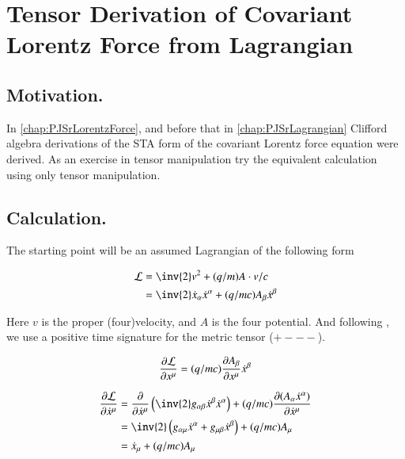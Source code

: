 \chapter{Tensor Derivation of Covariant Lorentz Force from Lagrangian}
\label{chap:maxwellTensorLagrangian}
\date{ October 12, 2008.  $RCSfile: maxwellTensorLagrangian.tex,v $ Last $Revision: 1.13 $ $Date: 2009/07/04 18:48:21 $ }

\section{Motivation. }

In \ref{chap:PJSrLorentzForce}, and before that in \ref{chap:PJSrLagrangian} Clifford
algebra derivations of the STA form of the covariant Lorentz force equation
were derived.  As an exercise in tensor manipulation try the equivalent
calculation using only tensor manipulation.

\section{Calculation. }

The starting point will be an assumed Lagrangian of the following form

\begin{align}\label{eqn:maxwell_tensor_lagrangian:lagrangian}
\LL &= \inv{2} v^2 + (q/m) A \cdot v/c \\
&= \inv{2} \xdot_\alpha \xdot^\alpha + (q/mc) A_\beta \xdot^\beta
\end{align}

Here $v$ is the proper (four)velocity, and $A$ is the four potential.
And following \cite{doran2003gap}, we use a positive time signature for the metric tensor ($+---$).

\begin{align*}
\PD{x^\mu}{\LL} = (q/mc) \PD{x^\mu}{A_\beta} \xdot^\beta
\end{align*}

\begin{align*}
\PD{\xdot^\mu}{\LL}
&= \PD{\xdot^\mu}{} \left( \inv{2} g_{\alpha\beta} \xdot^\beta \xdot^\alpha \right) + (q/mc) \PD{\xdot^\mu}{(A_\alpha \xdot^\alpha)} \\
&= \inv{2} \left( g_{\alpha\mu} \xdot^\alpha +g_{\mu\beta} \xdot^\beta \right) + (q/mc) A_\mu \\
&= \xdot_\mu + (q/mc) A_\mu \\
\end{align*}

